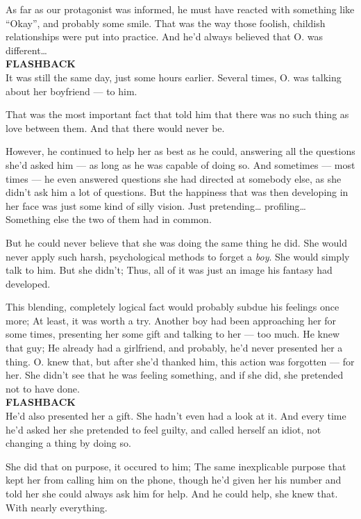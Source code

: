 As far as our protagonist was informed, he must have reacted with something like \enquote{Okay}, and probably some smile. 
That was the way those foolish, childish relationships were put into practice. 
And he'd always believed that O. was different\dots{}\\
\textbf{FLASHBACK}\\
It was still the same day, just some hours earlier. 
Several times, O. was talking about her boyfriend --- to him.

That was the most important fact that told him that there was no such thing as love between them. 
And that there would never be.

However, he continued to help her as best as he could, answering all the questions she'd asked him --- as long as he was capable of doing so. 
And sometimes --- most times --- he even answered questions she had directed at somebody else, as she didn't ask him a lot of questions. 
But the happiness that was then developing in her face was just some kind of silly vision. 
Just pretending\dots{} profiling\dots{}\\
Something else the two of them had in common.

But he could never believe that she was doing the same thing he did. 
She would never apply such harsh, psychological methods to forget a \emph{boy}. She would simply talk to him. 
But she didn't; Thus, all of it was just an image his fantasy had developed.

This blending, completely logical fact would probably subdue his feelings once more; At least, it was worth a try. 
Another boy had been approaching her for some times, presenting her some gift and talking to her --- too much. 
He knew that guy; He already had a girlfriend, and probably, he'd never presented her a thing. 
O. knew that, but after she'd thanked him, this action was forgotten --- for her. 
She didn't see that he was feeling something, and if she did, she pretended not to have done.\\
\textbf{FLASHBACK}\\
He'd also presented her a gift. 
She hadn't even had a look at it.
And every time he'd asked her she pretended to feel guilty, and called herself an idiot, not changing a thing by doing so.

She did that on purpose, it occured to him; The same inexplicable purpose that kept her from calling him on the phone, though he'd given her his number and told her she could always ask him for help. 
And he could help, she knew that.
With nearly everything.

